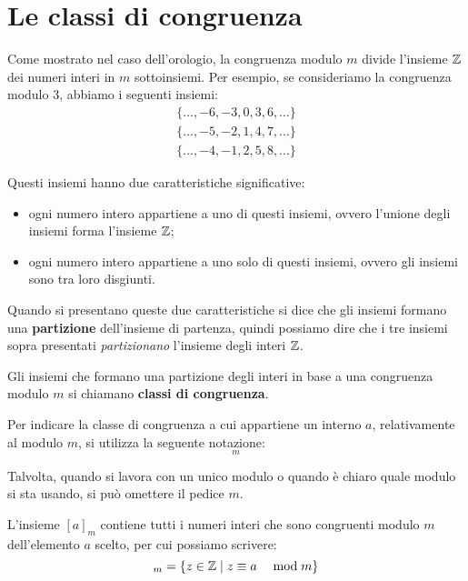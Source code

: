 \section{Le classi di congruenza}
\label{sec:classi_di_congruenza}

Come mostrato nel caso dell'orologio, la congruenza modulo $m$ divide l'insieme $ \mathbb{Z} $ dei numeri interi in $m$ sottoinsiemi.
Per esempio, se consideriamo la congruenza modulo 3, abbiamo i seguenti insiemi:
\begin{gather*}
    \{\dots, -6, -3, 0, 3, 6, \dots\} \\
    \{\dots, -5, -2, 1, 4, 7, \dots\} \\
    \{\dots, -4, -1, 2, 5, 8, \dots\}
\end{gather*}

Questi insiemi hanno due caratteristiche significative:
\begin{itemize}
    \item ogni numero intero appartiene a uno di questi insiemi, ovvero l'unione degli insiemi forma l'insieme $ \mathbb{Z} $;
    \item ogni numero intero appartiene a uno solo di questi insiemi, ovvero gli insiemi sono tra loro disgiunti.
\end{itemize}

Quando si presentano queste due caratteristiche si dice che gli insiemi formano una \textbf{partizione} dell'insieme di partenza, quindi possiamo dire che i tre insiemi sopra presentati \emph{partizionano} l'insieme degli interi $ \mathbb{Z} $.

\begin{definizione}
    Gli insiemi che formano una partizione degli interi in base a una congruenza modulo $m$ si chiamano \textbf{classi di congruenza}.
\end{definizione}

Per indicare la classe di congruenza a cui appartiene un interno $a$, relativamente al modulo $m$, si utilizza la seguente notazione:
\begin{equation*}
    [a]_m
\end{equation*}

Talvolta, quando si lavora con un unico modulo o quando è chiaro quale modulo si sta usando, si può omettere il pedice $m$.

L'insieme $[a]_m$ contiene tutti i numeri interi che sono congruenti modulo $m$ dell'elemento $a$ scelto, per cui possiamo scrivere:
\begin{equation*}
    [a]_m = \{z \in \Z \mid \congruenti{z}{a}{m}\}
\end{equation*}

